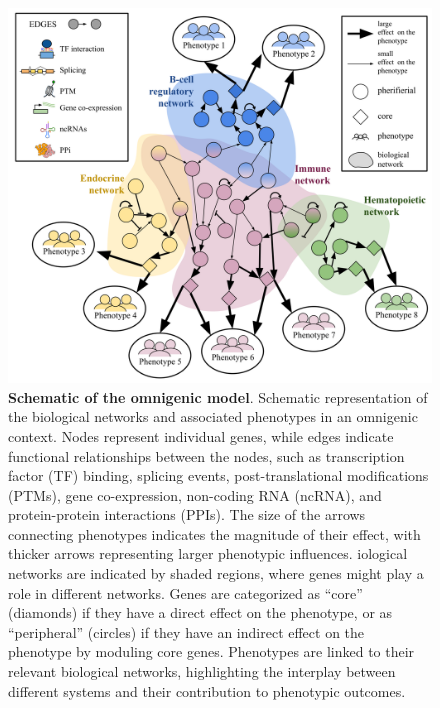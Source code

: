 \begin{figure}
\hypertarget{fig:fig2}{%
\centering
\includegraphics[width=1\textwidth,height=\textheight]{images/fig2.svg}
\caption{\textbf{Schematic of the omnigenic model}.
Schematic representation of the biological networks and associated phenotypes in an omnigenic context.
Nodes represent individual genes, while edges indicate functional relationships between the nodes, such as transcription factor (TF) binding, splicing events, post-translational modifications (PTMs), gene co-expression, non-coding RNA (ncRNA), and protein-protein interactions (PPIs).
The size of the arrows connecting phenotypes indicates the magnitude of their effect, with thicker arrows representing larger phenotypic influences.
iological networks are indicated by shaded regions, where genes might play a role in different networks.
Genes are categorized as ``core'' (diamonds) if they have a direct effect on the phenotype, or as ``peripheral'' (circles) if they have an indirect effect on the phenotype by moduling core genes.
Phenotypes are linked to their relevant biological networks, highlighting the interplay between different systems and their contribution to phenotypic outcomes.}\label{fig:fig2}
}
\end{figure}

